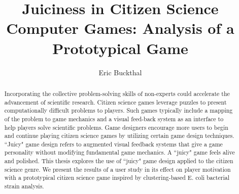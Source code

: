 \documentclass[12pt]{ucthesis}
\begin{document}

\title{Juiciness in Citizen Science Computer Games: Analysis of a Prototypical Game}
\author{Eric Buckthal}

  
 


 



\maketitle

\begin{frontmatter}

\copyrightpage

\committeemembershippage

\begin{abstract}

Incorporating the collective problem-solving skills of non-experts could accelerate the advancement of scientific research. Citizen science games leverage puzzles to present computationally difficult problems to players. Such games typically include a mapping of the problem to game mechanics and a visual feed-back system as an interface to help players solve scientific problems. Game designers encourage more users to begin and continue playing citizen science games by utilizing certain game design techniques. ``Juicy" game design refers to augmented visual feedback systems that give a game personality without modifying fundamental game mechanics. A ``juicy" game feels alive and polished. This thesis explores the use of ``juicy" game design applied to the citizen science genre. We present the results of a user study in its effect on player motivation with a prototypical citizen science game inspired by clustering-based E. coli bacterial strain analysis.

\end{abstract}



\tableofcontents

\listoftables

\listoffigures

\end{frontmatter}
\end{document}
